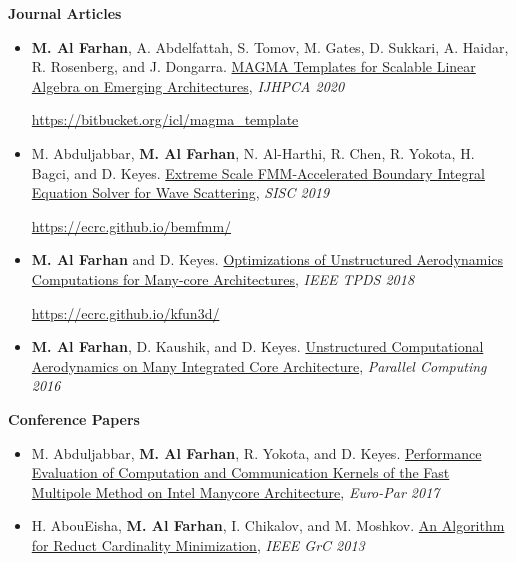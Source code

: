 \documentclass[9pt,a4paper]{extarticle}
\begin{document}
{
\textbf{Journal Articles}
\begin{itemize}
\item
\textbf{M. Al Farhan}, A. Abdelfattah, S. Tomov, M. Gates, D. Sukkari, A. Haidar,
R. Rosenberg, and J. Dongarra.
\href{}
{MAGMA Templates for Scalable Linear Algebra on Emerging
Architectures}, \textit{IJHPCA 2020}

\url{https://bitbucket.org/icl/magma_template}
\item
M. Abduljabbar, \textbf{M. Al Farhan}, N. Al-Harthi, R. Chen, R. Yokota, H. Bagci,
and D. Keyes. \href{https://epubs.siam.org/doi/10.1137/18M1173599}
{{Extreme Scale FMM-Accelerated Boundary Integral Equation
Solver for Wave Scattering}}, \textit{SISC 2019}

\url{https://ecrc.github.io/bemfmm/}
\item
\textbf{M. Al Farhan} and D. Keyes.
\href{https://ieeexplore.ieee.org/document/8337750}
{{Optimizations of Unstructured Aerodynamics Computations
for Many-core Architectures}}, \textit{IEEE TPDS 2018}

\url{https://ecrc.github.io/kfun3d/}
\item
\textbf{M. Al Farhan},
D. Kaushik, and D. Keyes.
\href{https://www.sciencedirect.com/science/article/pii/S0167819116300564}
{{Unstructured Computational Aerodynamics on Many
Integrated Core Architecture}}, \textit{Parallel Computing 2016}\\
\end{itemize}

\textbf{Conference Papers}
\begin{itemize}
\item
M. Abduljabbar,
\textbf{M. Al Farhan},
R. Yokota, and D. Keyes.
\href{https://link.springer.com/chapter/10.1007/978-3-319-64203-1_40}
{{Performance Evaluation of Computation and Communication
Kernels of the Fast Multipole Method on Intel Manycore Architecture}},
\textit{Euro-Par 2017}
\item
H. AbouEisha,
\textbf{M. Al Farhan},
I. Chikalov, and M. Moshkov.
\href{https://ieeexplore.ieee.org/document/6740370}
{{An Algorithm for Reduct Cardinality Minimization}},
\textit{IEEE GrC 2013}


\end{itemize}}
\end{document}
